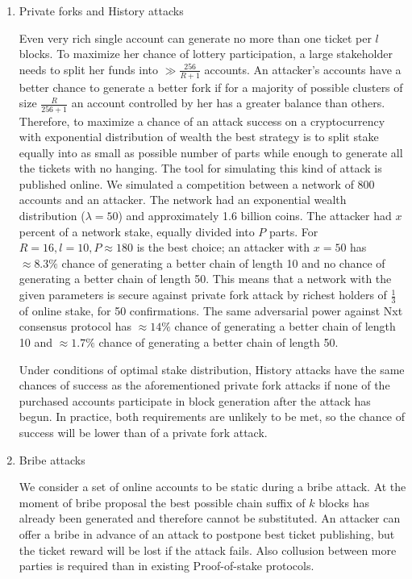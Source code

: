 \documentclass[preprint,review,3p,times,twocolumn]{elsarticle}
\begin{document}
\begin{enumerate}

\item Private forks and History attacks

Even very rich single account can generate no more than one ticket per \(l\) blocks. To maximize her chance of lottery participation, a large stakeholder needs to split her funds into \(\gg \frac{256}{R+1}\) accounts. An attacker's accounts have a better chance to generate a better fork if for a majority of possible clusters of size \(\frac{R}{256+1}\) an account controlled by her has a greater balance than others. Therefore, to maximize a chance of an attack success on a cryptocurrency with exponential distribution of wealth the best strategy is to split stake equally into as small as possible number of parts while enough to generate all the tickets with no hanging. The tool for simulating this kind of attack is published online\cite{Chepurnoy}. We simulated a competition between a network of 800 accounts and an attacker. The network had an exponential wealth distribution (\(\lambda = 50\)) and approximately 1.6 billion coins.  The attacker had \(x\) percent of a network stake, equally divided into \(P\) parts. For \(R=16, l=10, P \approx 180\) is the best choice; an attacker with \(x=50\) has \(\approx 8.3\%\) chance of generating a better chain of length 10 and no chance of generating a better chain of length 50. This means that a network with the given parameters is secure against private fork attack by richest holders of \(\frac{1}{3}\) of online stake, for 50 confirmations. The same adversarial power against Nxt consensus protocol has \(\approx 14\%\) chance of generating a better chain of length 10 and \(\approx 1.7\%\) chance of generating a better chain of length 50. 

Under conditions of optimal stake distribution, History attacks have the same chances of success as the aforementioned private fork attacks if none of the purchased accounts participate in block generation after the attack has begun. In practice, both requirements are unlikely to be met, so the chance of success will be lower than of a private fork attack.

\item Bribe attacks

We consider a set of online accounts to be static during a bribe attack. At the moment of bribe proposal the best possible chain suffix of \(k\) blocks has already been generated and therefore cannot be substituted. An attacker can offer a bribe in advance of an attack to postpone best ticket publishing, but the ticket reward will be lost if the attack fails. Also collusion between more parties is required than in existing Proof-of-stake protocols.


\end{enumerate}
\end{document}
